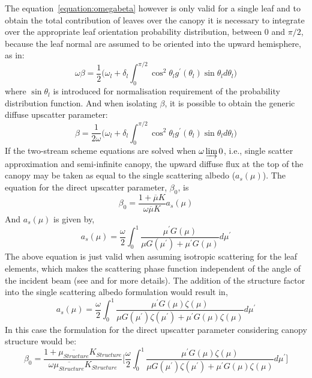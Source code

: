 The equation~\ref{equation:omegabeta} however is only valid for a single leaf and to obtain the total contribution of leaves over the canopy it is necessary to integrate over the appropriate leaf orientation probability distribution, between 0 and $\pi/2$, because the leaf normal are assumed to be oriented into the upward hemisphere, as in:
\begin{equation}
\omega\beta = \frac{1}{2}\Big(\omega_l + \delta_l \int_{0}^{\pi/2} \cos^2 \theta_l g^\prime(\theta_l) \sin \theta_l d\theta_l\Big)
\label{equation:omegabeta2}
\end{equation}
\noindent where $\sin\theta_l$ is introduced for normalisation requirement of the probability distribution function. And when isolating $\beta$, it is possible to obtain the generic diffuse upscatter parameter:
\begin{equation}
\beta = \frac{1}{2\omega}\Big(\omega_l + \delta_l \int_{0}^{\pi/2} \cos^2 \theta_l g^\prime(\theta_l) \sin \theta_l d\theta_l\Big)
\label{equation:beta}
\end{equation}
If the two-stream scheme equations are solved when $\omega \varinjlim 0$, i.e., single scatter approximation and semi-infinite canopy, the upward diffuse flux at the top of the canopy may be taken as equal to the single scattering albedo ($a_s(\mu)$). The equation for the direct upscatter parameter, $\beta_0$, is
\begin{equation}
\beta_0 = \frac{1 + \overline{\mu}K}{\omega\overline{\mu}K}a_s(\mu)
\label{equation:betazero}
\end{equation}
And $a_s(\mu)$ is given by, 
\begin{equation}
a_s(\mu) = \frac{\omega}{2}\int_{0}^{1} \frac{\mu^\prime G(\mu)}{\mu G(\mu^\prime) + \mu^\prime G(\mu)} d\mu^\prime
\label{equation:alphas}
\end{equation}
The above equation is just valid when assuming isotropic scattering for the leaf elements, which makes the scattering phase function independent of the angle of the incident beam (see \citet{Dickinson1983} and \citet{Sellers1985} for more details). The addition of the structure factor into the single scattering albedo formulation would result in,  
\begin{equation}
a_s(\mu) = \frac{\omega}{2}\int_{0}^{1} \frac{\mu^\prime G(\mu) \zeta(\mu)}{\mu G(\mu^\prime) \zeta(\mu^\prime) + \mu^\prime G(\mu)\zeta(\mu)} d\mu^\prime
\label{equation:alphasstruct}
\end{equation}
In this case the formulation for the direct upscatter parameter considering canopy structure would be: 
\begin{equation}
\beta_0 = \frac{1 + \overline{\mu_{Structure}}K_{Structure}}{\omega\overline{\mu_{Structure}}K_{Structure}}
\bigg[\frac{\omega}{2}\int_{0}^{1} \frac{\mu^\prime G(\mu) \zeta(\mu)}{\mu G(\mu^\prime) \zeta(\mu^\prime) + \mu^\prime G(\mu)\zeta(\mu)} d\mu^\prime \bigg]
\label{equation:alphasstruct}
\end{equation}

